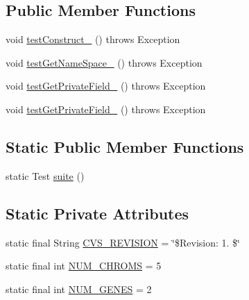 \subsection*{Public Member Functions}
\begin{DoxyCompactItemize}
\item 
void \hyperlink{classorg_1_1jgap_1_1data_1_1config_1_1_root_configuration_handler_test_a7b6e61e086968996f6f1d5ee3a02826a}{test\-Construct\-\_} ()  throws Exception 
\item 
void \hyperlink{classorg_1_1jgap_1_1data_1_1config_1_1_root_configuration_handler_test_a1fcfa4b317b82160eb1937e99db73c1a}{test\-Get\-Name\-Space\-\_} ()  throws Exception 
\item 
void \hyperlink{classorg_1_1jgap_1_1data_1_1config_1_1_root_configuration_handler_test_a22c634d6f202491c0db918ad8d904b8f}{test\-Get\-Private\-Field\-\_} ()  throws Exception 
\item 
void \hyperlink{classorg_1_1jgap_1_1data_1_1config_1_1_root_configuration_handler_test_aecc40155fe331a5c039e5bd83a9fabe9}{test\-Get\-Private\-Field\-\_} ()  throws Exception 
\end{DoxyCompactItemize}
\subsection*{Static Public Member Functions}
\begin{DoxyCompactItemize}
\item 
static Test \hyperlink{classorg_1_1jgap_1_1data_1_1config_1_1_root_configuration_handler_test_a7529979255ae091a5cb2a5e08f6d9706}{suite} ()
\end{DoxyCompactItemize}
\subsection*{Static Private Attributes}
\begin{DoxyCompactItemize}
\item 
static final String \hyperlink{classorg_1_1jgap_1_1data_1_1config_1_1_root_configuration_handler_test_af3aa257184ffc9921853c0311c439ed5}{C\-V\-S\-\_\-\-R\-E\-V\-I\-S\-I\-O\-N} = \char`\"{}\$Revision\-: 1. \$\char`\"{}
\item 
static final int \hyperlink{classorg_1_1jgap_1_1data_1_1config_1_1_root_configuration_handler_test_ad737c570c1d64c3c866524dd5f2a3289}{N\-U\-M\-\_\-\-C\-H\-R\-O\-M\-S} = 5
\item 
static final int \hyperlink{classorg_1_1jgap_1_1data_1_1config_1_1_root_configuration_handler_test_a78b235e16964722e46bffd19c656bba4}{N\-U\-M\-\_\-\-G\-E\-N\-E\-S} = 2
\end{DoxyCompactItemize}
